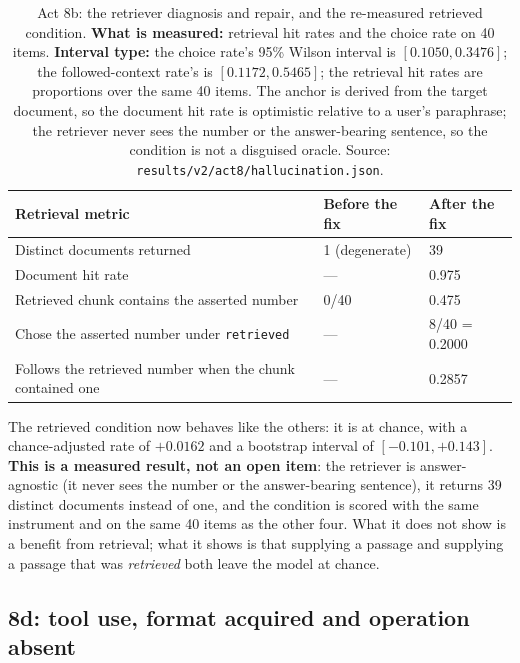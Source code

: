 \documentclass[11pt,a4paper]{article}
\begin{document}
\begin{table}[H]
\centering
\begin{tabular}{L{6.4cm}R{3.0cm}R{2.8cm}}
\toprule
Retrieval metric & Before the fix & After the fix \\
\midrule
Distinct documents returned & 1 (degenerate) & 39 \\
Document hit rate & --- & 0.975 \\
Retrieved chunk contains the asserted number & 0/40 & 0.475 \\
Chose the asserted number under \texttt{retrieved} & --- & 8/40 = 0.2000 \\
Follows the retrieved number when the chunk contained one & --- & 0.2857 \\
\bottomrule
\end{tabular}
\caption{Act 8b: the retriever diagnosis and repair, and the re-measured
retrieved condition. \textbf{What is measured:} retrieval hit rates and the
choice rate on 40 items. \textbf{Interval type:} the choice rate's 95\% Wilson
interval is $[0.1050, 0.3476]$; the followed-context rate's is
$[0.1172, 0.5465]$; the retrieval hit rates are proportions over the same 40
items. The anchor is derived from the target document, so the document hit
rate is optimistic relative to a user's paraphrase; the retriever never sees
the number or the answer-bearing sentence, so the condition is not a disguised
oracle. Source: \texttt{results/v2/act8/hallucination.json}.}
\label{tab:act8-retrieval}
\end{table}

The retrieved condition now behaves like the others: it is at chance, with a
chance-adjusted rate of $+0.0162$ and a bootstrap interval of
$[-0.101, +0.143]$. \textbf{This is a measured result, not an open item}: the
retriever is answer-agnostic (it never sees the number or the answer-bearing
sentence), it returns 39 distinct documents instead of one, and the condition
is scored with the same instrument and on the same 40 items as the other four.
What it does not show is a benefit from retrieval; what it shows is that
supplying a passage and supplying a passage that was \emph{retrieved} both
leave the model at chance.

\subsection{8d: tool use, format acquired and operation absent}
\label{sec:act8d}
\end{document}
